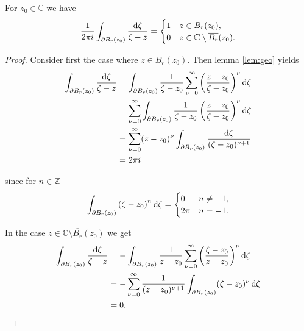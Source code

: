 \begin{enumerate}[label = \textbf{Exercise \arabic*.},wide = 0pt, itemsep=1.5ex]
	\begin{proposition}
		For $z_0 \in \mathbb{C}$ we have
		\begin{align}
			\frac{1}{2\pi i}\int_{\partial B_r(z_0)} \frac{\mathop{}\!\mathrm{d} \zeta}{\zeta - z} = \begin{cases}
				1 & z \in B_r(z_0),\\
				0 & z \in \mathbb{C} \setminus \overline{B_r}(z_0).
			\end{cases}
		\end{align}
	\end{proposition}

	\begin{proof}
		Consider first the case where $z \in B_r(z_0)$. Then lemma \ref{lem:geo} yields
		\begin{align*}
			\int_{\partial B_r(z_0)} \frac{\d \zeta}{\zeta - z} &= \int_{\partial B_r(z_0)} \frac{1}{\zeta - z_0}\sum_{\nu = 0}^\infty \del{\frac{z - z_0}{\zeta - z_0}}^{\nu} \d \zeta\\
			&= \sum_{\nu = 0}^\infty\int_{\partial B_r(z_0)} \frac{1}{\zeta - z_0}\del{\frac{z - z_0}{\zeta - z_0}}^{\nu} \d \zeta\\
			&= \sum_{\nu = 0}^\infty (z - z_0)^\nu \int_{\partial B_r(z_0)} \frac{\d\zeta}{(\zeta - z_0)^{\nu + 1}}\\
			&= 2\pi i
		\end{align*}

		\noindent since for $n \in \mathbb{Z}$
		\begin{align}
			\int_{\partial B_r(z_0)} \del[0]{\zeta - z_0}^n \d\zeta = \begin{cases}
				0 & n \neq -1,\\
				2\pi  & n = -1.
			\end{cases}
		\end{align}

		In the case $z \in \mathbb{C} \setminus \overline{B_r}(z_0)$ we get
		\begin{align*}
			\int_{\partial B_r(z_0)} \frac{\d \zeta}{\zeta - z} &= -\int_{\partial B_r(z_0)} \frac{1}{z - z_0} \sum_{\nu = 0}^\infty \del{\frac{\zeta - z_0}{z - z_0}}^{\nu} \d \zeta\\
			&= -\sum_{\nu = 0}^\infty \frac{1}{(z - z_0)^{\nu + 1}}\int_{\partial B_r(z_0)} (\zeta - z_0)^\nu \d \zeta\\
			&= 0. 
		\end{align*}
	\end{proof}
\end{enumerate}
\printbibliography

